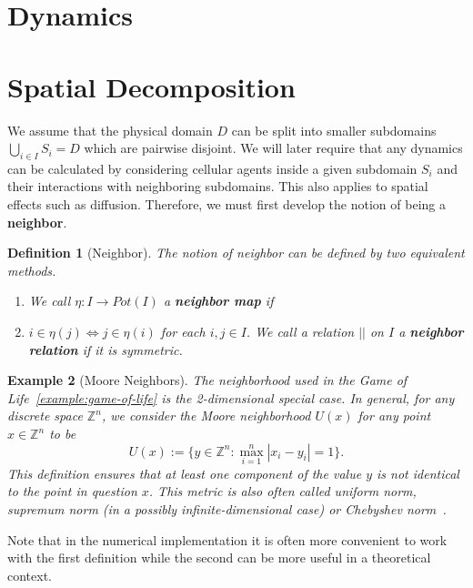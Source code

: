 \documentclass{article}
\newtheorem{definition}{Definition}[section]
\newtheorem{example}[definition]{Example}
\begin{document}
\section{Dynamics}

\section{Spatial Decomposition}
We assume that the physical domain $D$ can be split into smaller subdomains
$\bigcup_{i\in I}S_i=D$ which are pairwise disjoint.
We will later require that any dynamics can be calculated by considering cellular agents inside a
given subdomain $S_i$ and their interactions with neighboring subdomains.
This also applies to spatial effects such as diffusion.
Therefore, we must first develop the notion of being a \textbf{neighbor}.

\begin{definition}[Neighbor]
    The notion of neighbor can be defined by two equivalent methods.
    \begin{enumerate}
        \item We call $\eta:I\rightarrow Pot(I)$ a \textbf{neighbor map} if
        \item $i\in\eta(j) \Leftrightarrow j\in\eta(i)$ for each $i,j\in I$.
            We call a relation $||$ on $I$ a \textbf{neighbor relation} if it is symmetric.
    \end{enumerate}
\end{definition}

\begin{example}[Moore Neighbors]
    The neighborhood used in the Game of Life~\ref{example:game-of-life} is the 2-dimensional
    special case.
    In general, for any discrete space $\mathbb{Z}^n$, we consider the Moore neighborhood $U(x)$ for
    any point $x\in\mathbb{Z}^n$ to be
    \begin{equation}
        U(x) := \{y\in\mathbb{Z}^n:\max\limits_{i=1}^n|x_i-y_i|=1\}.
    \end{equation}
    This definition ensures that at least one component of the value $y$ is not identical to the
    point in question $x$.
    This metric is also often called uniform norm, supremum norm (in a possibly infinite-dimensional
    case) or Chebyshev norm~\cite{Rudin1976}.
\end{example}

Note that in the numerical implementation it is often more convenient to work with the first
definition while the second can be more useful in a theoretical context.
\end{document}
